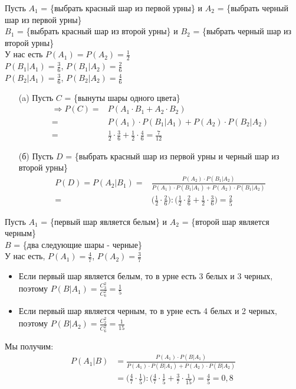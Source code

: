 \begin{exercise}[7]
	Пусть $A_1$ = \{выбрать красный шар из первой урны\} и $A_2$ = \{выбрать черный шар из первой урны\} \\ $B_1$ = \{выбрать красный шар из второй урны\} и $B_2$ = \{выбрать черный шар из второй урны\} \\ У нас есть $P(A_1) = P(A_2) = \frac{1}{2}$ \\ $P(B_1 | A_1) = \frac{3}{6}$, $P(B_1 | A_2) = \frac{2}{6}$ \\ $P(B_2 | A_1) = \frac{3}{6}$, $P(B_2 | A_2) = \frac{4}{6}$
	\begin{enumerate}
		\item [(a)] Пусть $C$ = \{вынуты шары одного цвета\} 
		\begin{align*}
			\Rightarrow P(C) = & P(A_1 \cdot B_1 + A_2 \cdot B_2) \\ = & P(A_1) \cdot P(B_1 | A_1) + P(A_2) \cdot P(B_2 | A_2) \\ = & \frac{1}{2} \cdot \frac{3}{6} + \frac{1}{2} \cdot \frac{4}{6} = \frac{7}{12}
		\end{align*}
		\item [(б)] Пусть $D$ = \{выбрать красный шар из первой урны и черный шар из второй урны\}
		\begin{align*}
			P(D) = P(A_2 | B_1) = & \frac{P(A_2) \cdot P(B_1 | A_2)}{P(A_1) \cdot P(B_1 | A_1) + P(A_2) \cdot P(B_1 | A_2)} \\ = & \Big(\frac{1}{2} \cdot \frac{2}{6}\Big) : \Big(\frac{1}{2} \cdot \frac{2}{6} + \frac{1}{2} \cdot \frac{3}{6}\Big) = \frac{2}{5}
		\end{align*} 
	\end{enumerate}
\end{exercise}

\begin{exercise}[8]
	
\end{exercise}

\begin{exercise}[9]
	Пусть $A_1$ = \{первый шар является белым\} и $A_2$ = \{второй шар является черным\} \\ $B$ = \{два следующие шары - черные\} \\ У нас есть, $P(A_1) = \frac{4}{7}$, $P(A_2) = \frac{3}{7}$
	\begin{itemize}
		\item Если первый шар является белым, то в урне есть 3 белых и 3 черных, поэтому $P(B | A_1) = \frac{C^2_3}{C^2_6} = \frac{1}{5}$
		\item Если первый шар является черным, то в урне есть 4 белых и 2 черных, поэтому $P(B | A_2) = \frac{C^2_2}{C^2_6} = \frac{1}{15}$
	\end{itemize}
	Мы получим:
	\begin{align*}
		P(A_1 | B) & = \frac{P(A_1) \cdot P(B | A_1)}{P(A_1) \cdot P(B | A_1) + P(A_2) \cdot P(B | A_2)} \\ & = \Big(\frac{4}{7} \cdot \frac{1}{5}\Big) : \Big(\frac{4}{7} \cdot \frac{1}{5} + \frac{3}{7} \cdot \frac{1}{15}\Big) = \frac{4}{5} = 0,8
	\end{align*}
\end{exercise}

